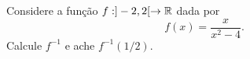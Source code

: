 Considere a função $f:]-2,2[\rightarrow\mathbb{R}$ dada por
\[
	f(x)=\frac{x}{x^2-4}.
\]
Calcule $f^{-1}$ e ache $f^{-1}(1/2)$.
